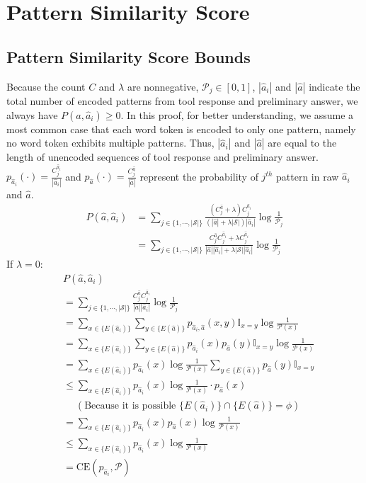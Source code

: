\documentclass[11pt]{article}
\begin{document}
\section{Pattern Similarity Score}
\label{Appendix:Pattern similarity}
\subsection{Pattern Similarity Score Bounds}
\label{Appendix: Pattern similarity proof}
Because the count $C$ and $\lambda$ are nonnegative, $\mathcal{P}_j \in [0,1]$, $|\hat{a}_i|$ and $|\hat{a}|$ indicate the total number of encoded patterns from tool response and preliminary answer, we always have $P(\hat{a},\hat{a}_i) \geq 0$. In this proof, for better understanding, we assume a most common case that each word token is encoded to only one pattern, namely no word token exhibits multiple patterns. Thus, $|\hat{a}_i|$ and $|\hat{a}|$ are equal to the length of unencoded sequences of tool response and preliminary answer. $p_{\hat{a}_i}(\cdot) = \frac{C_j^{\hat{a}_i}}{|\hat{a}_i|}$ and $p_{\hat{a}}(\cdot) = \frac{C_j^{\hat{a}}}{|\hat{a}|}$ represent the probability of $j^{th}$ pattern in raw $\hat{a}_i$ and $\hat{a}$.
\begin{align*}
P(\hat{a}, \hat{a}_i) &= \sum_{j\in \{1,\cdots,|\mathcal{S}|\}} \frac{(C_j^{\hat{a}} + \lambda)C_j^{\hat{a}_i}}{(|\hat{a}| + \lambda|\mathcal{S}|)|\hat{a}_i|}\log \frac{1}{\mathcal{P}_j} \\
&= \sum_{j\in \{1,\cdots,|\mathcal{S}|\}} \frac{C_j^{\hat{a}}C_j^{\hat{a}_i} + \lambda C_j^{\hat{a}_i}}{|\hat{a}| |\hat{a}_i| + \lambda|\mathcal{S}||\hat{a}_i|}\log \frac{1}{\mathcal{P}_j}
\end{align*}
If $\lambda = 0$:
\begin{align*}
&P(\hat{a},\hat{a}_i) \\
&= \sum_{j\in \{1,\cdots,|\mathcal{S}|\}} \frac{C_j^{\hat{a}}C_j^{\hat{a}_i}}{|\hat{a}||\hat{a}_i|}\log \frac{1}{\mathcal{P}_j} \\ 
&= \sum_{x\in \{E(\hat{a}_i)\}}\sum_{y\in \{E(\hat{a})\}} p_{\hat{a}_i,\hat{a}}(x,y) \mathbb{I}_{x=y}\log \frac{1}{\mathcal{P}(x)} \\
&= \sum_{x\in \{E(\hat{a}_i)\}}\sum_{y\in \{E(\hat{a})\}} p_{\hat{a}_i}(x)p_{\hat{a}}(y)\mathbb{I}_{x=y}\log \frac{1}{\mathcal{P}(x)} \\
&= \sum_{x\in \{E(\hat{a}_i)\}}p_{\hat{a}_i}(x)\log \frac{1}{\mathcal{P}(x)}\sum_{y\in \{E(\hat{a})\}}p_{\hat{a}}(y)\mathbb{I}_{x=y} \\
&\leq \sum_{x\in \{E(\hat{a}_i)\}}p_{\hat{a}_i}(x)\log \frac{1}{\mathcal{P}(x)} \cdot p_{\hat{a}}(x) \\ &\quad \; (\text{Because it is possible } \{E(\hat{a}_i)\}\cap \{E(\hat{a})\} = \phi)\\
&= \sum_{x\in \{E(\hat{a}_i)\}}p_{\hat{a}_i}(x)p_{\hat{a}}(x)\log \frac{1}{\mathcal{P}(x)} \\
&\leq \sum_{x\in \{E(\hat{a}_i)\}}p_{\hat{a}_i}(x)\log \frac{1}{\mathcal{P}(x)}\\
&= \text{CE}(p_{\hat{a}_i}, \mathcal{P})
\end{align*}
\end{document}
